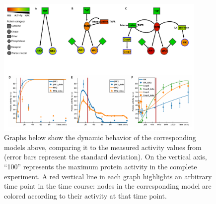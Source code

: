 \documentclass{bmcart}
\begin{document}
\begin{figure}[!htbp]
\centering
  \includegraphics[width=0.9\textwidth]{images/small_model_oneImage}
  \caption{
Graphs below show the dynamic behavior of the corresponding models above, comparing it to the measured
activity values from~\cite{pathway-compendium} (error bars represent the standard deviation).
On the vertical axis, ``100'' represents the maximum protein activity in the complete experiment.
A red vertical line in each graph highlights an arbitrary time point in the time course:
nodes in the corresponding model are colored according to their activity at that time point.
}
\end{figure}
\end{document}
